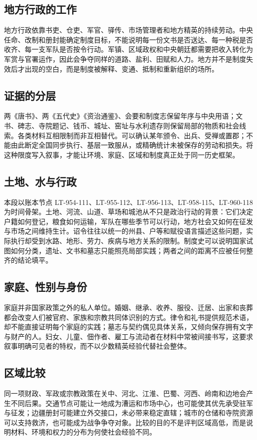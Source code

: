 \subsection{地方行政的工作}
地方行政依靠书吏、仓吏、军官、驿传、市场管理者和地方精英的持续劳动。中央任命、改制和册封能确定制度目标，不能说明每一份文书是否送达、每一种税是否收齐、每一支军队是否按令行动。军镇、区域政权和中央朝廷都需要把收入转化为军赏与官署运作，因此会争夺同样的道路、盐利、田赋和人力。地方并不是制度失效后才出现的空白，而是制度被解释、变通、抵制和重新组织的场所。

\subsection{证据的分层}
两《唐书》、两《五代史》《资治通鉴》、会要和制度志保留年序与中央用语；文书、碑志、寺院题记、钱币、城址、窑址与水利遗存则保留局部的物质和社会线索。各类材料互相限制而非互相替代。可以确认某年颁令、出兵、受禅或置郡；不能由此断定全国同步执行、基层一致服从，或精确统计未被保存的劳动和损失。将这种限度写入叙事，才能让环境、家庭、区域和制度真正处于同一历史框架。
\subsection{土地、水与行政}
本段以账本节点 LT-954-111、LT-955-112、LT-956-113、LT-958-115、LT-960-118 为时间骨架。土地、河流、山道、草场和城池从不只是政治行动的背景：它们决定户籍如何登记，粮食如何运输，军队在哪些季节可以行动，地方社会又如何在征发与市场之间维持生计。诏令往往以统一的州县、户等和赋役语言描述这些问题，实际执行却受到水路、地形、劳力、疾病与地方关系的限制。制度史可以说明国家试图如何分类，遗址、文书和墓志只能照亮局部实践；两者之间的距离不应被任何整齐的结论填平。

\subsection{家庭、性别与身份}
家庭并非国家政策之外的私人单位。婚姻、继承、收养、服役、迁居、出家和丧葬都会改变人们被官府、家族和宗教共同体识别的方式。律令和礼书提供规范术语，却不能直接证明每个家庭的实践；墓志与契约偶见具体关系，又倾向保存拥有文字与财产的人。妇女、儿童、佃作者、雇工与流动者在材料中常被间接书写，这要求叙事明确可见者的特权，而不以少数精英经验代替社会整体。

\subsection{区域比较}
同一项财政、军政或宗教政策在关中、河北、江淮、巴蜀、河西、岭南和边地会产生不同后果。交通节点可能让一地成为漕运和市场中心，也可能使其优先承受驻军与征发；边疆册封可能建立外交接口，未必带来稳定直辖；城市的仓储和寺院资源可以支持救济，也可能成为战争争夺对象。比较的目的不是评判区域高低，而是说明材料、环境和权力的分布为何使社会经验不同。

